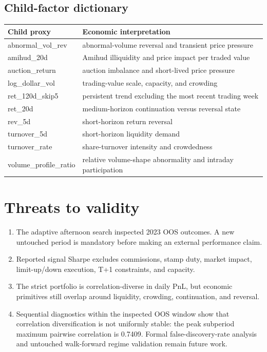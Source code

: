 \documentclass[10pt,a4paper]{article}
\begin{document}
\subsection{Child-factor dictionary}
\begin{longtable}{p{3.6cm} p{11.3cm}}
\toprule Child proxy & Economic interpretation \\\midrule
abnormal\_vol\_rev & abnormal-volume reversal and transient price pressure \\
amihud\_20d & Amihud illiquidity and price impact per traded value \\
auction\_return & auction imbalance and short-lived price pressure \\
log\_dollar\_vol & trading-value scale, capacity, and crowding \\
ret\_120d\_skip5 & persistent trend excluding the most recent trading week \\
ret\_20d & medium-horizon continuation versus reversal state \\
rev\_5d & short-horizon return reversal \\
turnover\_5d & short-horizon liquidity demand \\
turnover\_rate & share-turnover intensity and crowdedness \\
volume\_profile\_ratio & relative volume-shape abnormality and intraday participation \\
\bottomrule
\end{longtable}

\section{Threats to validity}
\begin{enumerate}
\item The adaptive afternoon search inspected 2023 OOS outcomes. A new untouched period is mandatory before
making an external performance claim.
\item Reported signal Sharpe excludes commissions, stamp duty, market impact, limit-up/down execution, T+1
constraints, and capacity.
\item The strict portfolio is correlation-diverse in daily PnL, but economic primitives still overlap around
liquidity, crowding, continuation, and reversal.
\item Sequential diagnostics within the inspected OOS window show that correlation diversification is not
uniformly stable: the peak subperiod maximum pairwise correlation is 0.7409. Formal
false-discovery-rate analysis and untouched walk-forward regime validation remain future work.
\end{enumerate}
\end{document}
